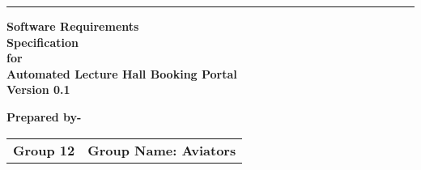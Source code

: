 \documentclass[a4paper,12pt]{article}
\begin{document}
\noindent\rule{\textwidth}{1pt}

\vspace{1cm}

\begin{flushright}
    \Huge\textbf{Software Requirements} \\[0cm]
    \Huge\textbf{Specification} \\[0.5cm]
    \Large\textbf{for} \\[0.5cm]
    \Huge\textbf{Automated Lecture Hall Booking Portal} \\[1cm]
    \Large\textbf{Version 0.1}
\end{flushright}

\vspace{1cm}

\begin{flushright}
    \Large\textbf{Prepared by-}
\end{flushright}

\vspace{0.5cm}

\begin{tabular}{@{}p{}p{}@{}}
    \textbf{Group 12} & \hfill\textbf{Group Name: Aviators} \\
\end{tabular}

\vspace{0.5cm}
\end{document}
